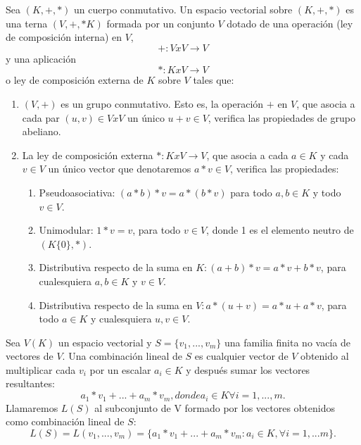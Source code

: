 \documentclass[a4paper,11pt, oneside]{book}
\begin{document}
\begin{espacio_vectorial}
	Sea $(K, +, *)$ un cuerpo conmutativo. Un espacio vectorial sobre $(K, +, *)$ es una terna $(V, +, *K)$ formada por un conjunto $V$ dotado de una operación (ley de composición interna) en $V$,
	\begin{equation}
	+ : V x V \rightarrow V
	\end{equation}
	y una aplicación
	\begin{equation}
	* : K x V \rightarrow V
	\end{equation}
	o ley de composición externa de $K$ sobre $V$ tales que:
	\begin{enumerate}
	\item $(V, +)$ es un grupo conmutativo. Esto es, la operación $+$ en $V$, que asocia a cada par $(u,v) \in V x V$ un único $u+v \in V$, verifica las propiedades de grupo abeliano.
	\item La ley de composición externa $* : K x V \rightarrow V$, que asocia a cada $a \in K$ y cada $
	v \in V$ un único vector que denotaremos $a * v \in V$, verifica las propiedades:
	\begin{enumerate}
		\item Pseudoasociativa: $(a * b)*v = a*(b*v)$ para todo $a,b \in K$ y todo $v \in V$.
		\item Unimodular: $1*v = v$, para todo $v \in V$, donde 1 es el elemento neutro de $(K\{0\},*)$.
		\item Distributiva respecto de la suma en $K:(a+b)*v=a*v+b*v$, para cualesquiera $a,b \in K$ y $v \in V$.
		\item Distributiva respecto de la suma en $V: a*(u+v) = a*u+a*v$, para todo $a \in K$ y cualesquiera $u,v \in V$.
	\end{enumerate}
	\end{enumerate}
\end{espacio_vectorial}
\begin{comb_lineal}
	Sea $V(K)$ un espacio vectorial y $S = \{v_1,...,v_m\}$ una familia finita no vacía de vectores de $V$. Una combinación lineal de $S$ es cualquier vector de $V$ obtenido al multiplicar cada $v_i$ por un escalar $a_i \in K$ y después sumar los vectores resultantes:
	\begin{equation}
	a_1*v_1+...+a_m*v_m, donde a_i \in K \forall i = 1,...,m.
	\end{equation}
	Llamaremos $L(S)$ al subconjunto de V formado por los vectores obtenidos como combinación lineal de $S$:
	\begin{equation}
	L(S) = L(v_1,...,v_m) = \{a_1*v_1+...+a_m*v_m : a_i \in K, \forall i = 1,...m\}.
	\end{equation}
\end{comb_lineal}
\end{document}
